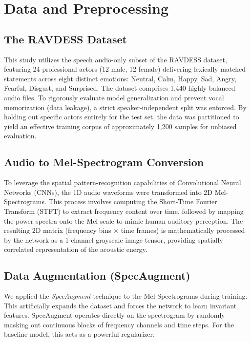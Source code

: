 \documentclass[12pt,hitec]{report}
\begin{document}

\section{Data and Preprocessing}
\subsection{The RAVDESS Dataset}
This study utilizes the speech audio-only subset of the RAVDESS dataset, featuring 24 professional actors (12 male, 12 female) delivering lexically matched statements across eight distinct emotions: Neutral, Calm, Happy, Sad, Angry, Fearful, Disgust, and Surprised. The dataset comprises 1,440 highly balanced audio files. To rigorously evaluate model generalization and prevent vocal memorization (data leakage), a strict speaker-independent split was enforced. By holding out specific actors entirely for the test set, the data was partitioned to yield an effective training corpus of approximately 1,200 samples for unbiased evaluation.




\subsection{Audio to Mel-Spectrogram Conversion}
To leverage the spatial pattern-recognition capabilities of Convolutional Neural Networks (CNNs), the 1D audio waveforms were transformed into 2D Mel-Spectrograms. This process involves computing the Short-Time Fourier Transform (STFT) to extract frequency content over time, followed by mapping the power spectra onto the Mel scale to mimic human auditory perception. The resulting 2D matrix (frequency bins $\times$ time frames) is mathematically processed by the network as a 1-channel grayscale image tensor, providing spatially correlated representation of the acoustic energy.



\subsection{Data Augmentation (SpecAugment)}
We applied the \textit{SpecAugment} technique to the Mel-Spectrograms during training. This artificially expands the dataset and forces the network to learn invariant features. SpecAugment operates directly on the spectrogram by randomly masking out continuous blocks of frequency channels and time steps. For the baseline model, this acts as a powerful regularizer. 
\end{document}
